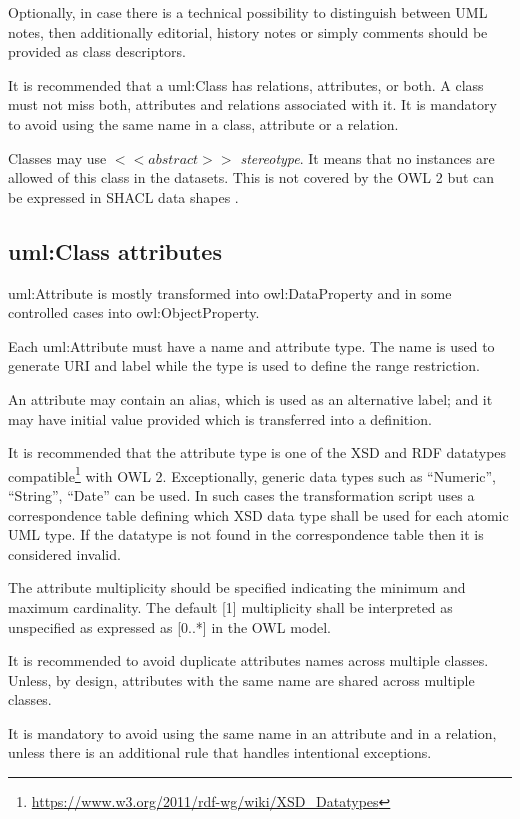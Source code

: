 	Optionally, in case there is a technical possibility to distinguish between UML notes, then additionally editorial, history notes or simply comments should be provided as class descriptors.
	
	It is recommended that a uml:Class has relations, attributes, or both. A class must not miss both, attributes and relations associated with it. 
	It is mandatory to avoid using the same name in a class, attribute or a relation. 
	
	Classes may use\textit{ $<<abstract>>$ stereotype}. It means that no instances are allowed of this class in the datasets. This is not covered by the OWL 2 \cite{owl2} but can be expressed in SHACL data shapes \cite{shacl-spec}. 
	
	\subsection{uml:Class attributes}
	\label{sec:attributes-class}
	
	uml:Attribute is mostly transformed into owl:DataProperty and in some controlled cases into owl:ObjectProperty.
	
	Each uml:Attribute must have a name and attribute type. The name is used to generate URI and label while the type is used to define the range restriction. 
	
	An attribute may contain an alias, which is used as an alternative label; and it may have initial value provided which is transferred into a definition.  	
	
	It is recommended that the attribute type is one of the XSD and RDF datatypes compatible\footnote{\url{https://www.w3.org/2011/rdf-wg/wiki/XSD_Datatypes}} with OWL 2. Exceptionally, generic data types such as ``Numeric'', ``String'', ``Date'' can be used. In such cases the transformation script uses a correspondence table defining which XSD data type shall be used for each atomic UML type. If the datatype is not found in the correspondence table then it is considered invalid. 
	
	The attribute multiplicity should be specified indicating the minimum and maximum cardinality. The default [1] multiplicity shall be interpreted as unspecified as expressed as [0..*] in the OWL model.
	
	It is recommended to avoid duplicate attributes names across multiple classes. Unless, by design, attributes with the same name are shared across multiple classes. 
	
	It is mandatory to avoid using the same name in an attribute and in a relation, unless there is an additional rule that handles intentional exceptions.  
	
